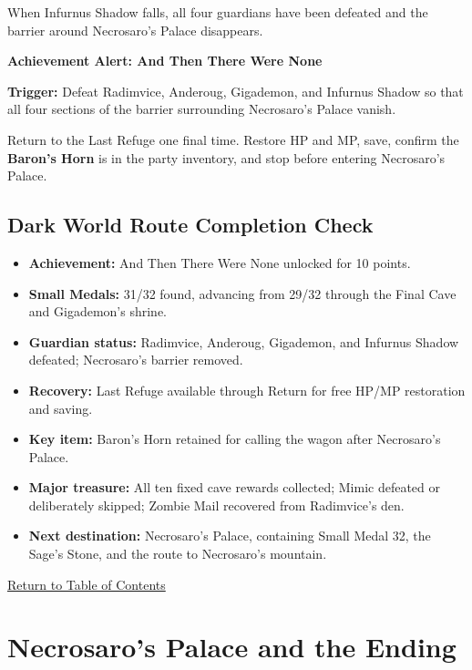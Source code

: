 \documentclass[
  american,
  10pt,
  letterpaper,
  oneside,
  open=any]{scrreprt}
\providecommand{\tightlist}{%
  \setlength{\itemsep}{0pt}\setlength{\parskip}{0pt}}
\begin{document}
When Infurnus Shadow falls, all four guardians have been defeated and
the barrier around Necrosaro's Palace disappears.

\begin{achievementalert}

\textbf{Achievement Alert: And Then There Were None}

\textbf{Trigger:} Defeat Radimvice, Anderoug, Gigademon, and Infurnus
Shadow so that all four sections of the barrier surrounding Necrosaro's
Palace vanish.

\end{achievementalert}

Return to the Last Refuge one final time. Restore HP and MP, save,
confirm the \textbf{Baron's Horn} is in the party inventory, and stop
before entering Necrosaro's Palace.

\section{Dark World Route Completion
Check}\label{dark-world-route-completion-check}

\begin{itemize}
\tightlist
\item
  \textbf{Achievement:} And Then There Were None unlocked for 10 points.
\item
  \textbf{Small Medals:} 31/32 found, advancing from 29/32 through the
  Final Cave and Gigademon's shrine.
\item
  \textbf{Guardian status:} Radimvice, Anderoug, Gigademon, and Infurnus
  Shadow defeated; Necrosaro's barrier removed.
\item
  \textbf{Recovery:} Last Refuge available through Return for free HP/MP
  restoration and saving.
\item
  \textbf{Key item:} Baron's Horn retained for calling the wagon after
  Necrosaro's Palace.
\item
  \textbf{Major treasure:} All ten fixed cave rewards collected; Mimic
  defeated or deliberately skipped; Zombie Mail recovered from
  Radimvice's den.
\item
  \textbf{Next destination:} Necrosaro's Palace, containing Small Medal
  32, the Sage's Stone, and the route to Necrosaro's mountain.
\end{itemize}

\hyperref[table-of-contents]{Return to Table of Contents}

\chapter{Necrosaro's Palace and the
Ending}\label{necrosaros-palace-and-the-ending}
\end{document}

